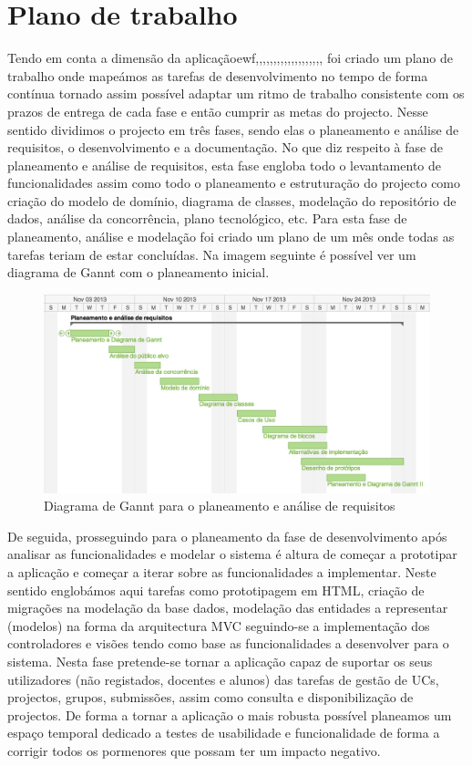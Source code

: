 \section{Plano de trabalho}
Tendo em conta a dimensão da aplicaçãoewf,,,,,,,,,,,,,,,,,,, foi criado um plano de trabalho onde mapeámos as tarefas
de desenvolvimento no tempo de forma contínua tornado assim possível adaptar um ritmo de trabalho
consistente com os prazos de entrega de cada fase e então cumprir as metas do projecto.
Nesse sentido dividimos o projecto em três fases, sendo elas o planeamento e análise de requisitos, o
desenvolvimento e a documentação.
No que diz respeito à fase de planeamento e análise de requisitos, esta fase engloba todo o levantamento 
de funcionalidades assim como todo o planeamento e estruturação do projecto como
criação do modelo de domínio, diagrama de classes, modelação do repositório de dados,
análise da concorrência, plano tecnológico, etc.
Para esta fase de planeamento, análise e modelação foi criado um plano de um mês onde todas as tarefas 
teriam de estar concluídas. Na imagem seguinte é possível ver um diagrama de Gannt com
o planeamento inicial.



\begin{figure}[htbp] 
	\centering
	\includegraphics[width=1\textwidth]{images/plano_trabalho_1.png}
 	\caption{Diagrama de Gannt para o planeamento e análise de requisitos}
 	\label{fig: workplan1}
\end{figure}


De seguida, prosseguindo para o planeamento da fase de desenvolvimento após 
analisar as funcionalidades e modelar o sistema  é altura de começar a 
prototipar a aplicação e começar a iterar sobre as funcionalidades a 
implementar. Neste sentido englobámos aqui tarefas como prototipagem em HTML, 
criação de migrações na modelação da base dados, modelação das entidades a 
representar (modelos) na forma da arquitectura MVC seguindo-se a implementação dos 
controladores e visões tendo como base as funcionalidades a desenvolver para o 
sistema.  Nesta fase pretende-se tornar a aplicação capaz de suportar os seus 
utilizadores (não registados, docentes e alunos) das tarefas de gestão de UCs, 
projectos, grupos, submissões, assim como consulta e disponibilização de 
projectos. De forma a tornar a aplicação o mais robusta possível planeamos um 
espaço temporal dedicado a testes de usabilidade e funcionalidade de forma a 
corrigir todos os pormenores que possam ter um impacto negativo.



